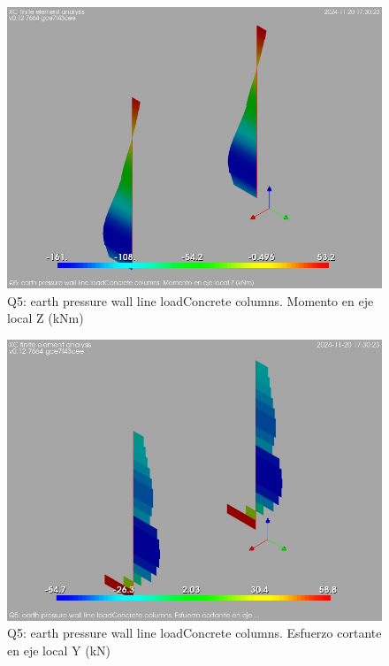 \begin{figure}[ht]
\begin{center}
\includegraphics[width=\linewidth]{results/graphics/resSimplLC/QearthPWallLinLcolumnZconcrMz.png}
\caption{Q5: earth pressure wall line loadConcrete columns. Momento en eje local Z (kNm)}
\label{QearthPWallLinLcolumnZconcrMz}
\end{center}
\end{figure}
\begin{figure}[ht]
\begin{center}
\includegraphics[width=\linewidth]{results/graphics/resSimplLC/QearthPWallLinLcolumnZconcrVy.png}
\caption{Q5: earth pressure wall line loadConcrete columns. Esfuerzo cortante en eje local Y (kN)}
\label{QearthPWallLinLcolumnZconcrVy}
\end{center}
\end{figure}
